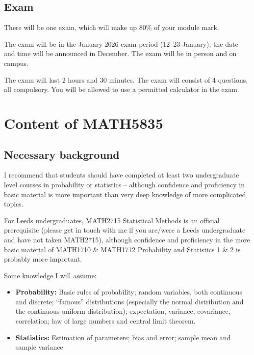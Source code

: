 \documentclass[
  letterpaper,
  DIV=11,
  numbers=noendperiod]{scrreprt}
\theoremstyle{plain}
\theoremstyle{definition}
\theoremstyle{definition}
\theoremstyle{remark}
\begin{document}
\subsection*{Exam}\label{exam}

There will be one exam, which will make up 80\% of your module mark.

The exam will be in the January 2026 exam period (12--23 January); the
date and time will be announced in December. The exam will be in person
and on campus.

The exam will last 2 hours and 30 minutes. The exam will consist of 4
questions, all compulsory. You will be allowed to use a permitted
calculator in the exam.

\section*{Content of MATH5835}\label{content-of-math5835}


\subsection*{Necessary background}\label{necessary-background}

I recommend that students should have completed at least two
undergraduate level courses in probability or statistics -- although
confidence and proficiency in basic material is more important than very
deep knowledge of more complicated topics.

For Leeds undergraduates, MATH2715 Statistical Methods is an official
prerequisite (please get in touch with me if you are/were a Leeds
undergraduate and have not taken MATH2715), although confidence and
proficiency in the more basic material of MATH1710 \& MATH1712
Probability and Statistics 1 \& 2 is probably more important.

Some knowledge I will assume:

\begin{itemize}
\item
  \textbf{Probability:} Basic rules of probability; random variables,
  both continuous and discrete; ``famous'' distributions (especially the
  normal distribution and the continuous uniform distribution);
  expectation, variance, covariance, correlation; law of large numbers
  and central limit theorem.
\item
  \textbf{Statistics:} Estimation of parameters; bias and error; sample
  mean and sample variance
\end{itemize}
\end{document}
